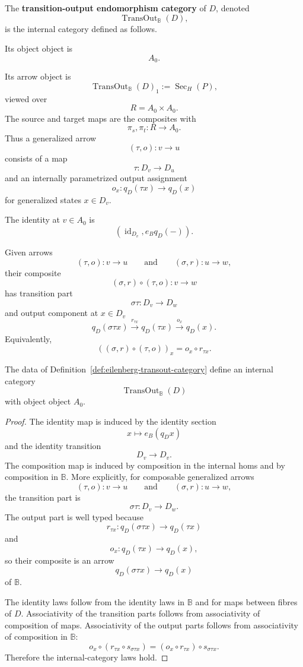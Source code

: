 \begin{definition}
\label{def:eilenberg-transout-category}
The \textbf{transition-output endomorphism category} of \(D\), denoted
\[
\operatorname{TransOut}_{\mathbb B}(D),
\]
is the internal category defined as follows.

Its object object is
\[
A_0.
\]

Its arrow object is
\[
\operatorname{TransOut}_{\mathbb B}(D)_1
:=
\operatorname{Sec}_H(P),
\]
viewed over
\[
R=A_0\times A_0.
\]
The source and target maps are the composites with
\[
\pi_s,\pi_t:R\to A_0.
\]
Thus a generalized arrow
\[
(\tau,o):v\to u
\]
consists of a map
\[
\tau:D_v\to D_u
\]
and an internally parametrized output assignment
\[
o_x:q_D(\tau x)\to q_D(x)
\]
for generalized states \(x\in D_v\).

The identity at \(v\in A_0\) is
\[
(\operatorname{id}_{D_v}, e_Bq_D(-)).
\]

Given arrows
\[
(\tau,o):v\to u
\qquad\text{and}\qquad
(\sigma,r):u\to w,
\]
their composite
\[
(\sigma,r)\circ(\tau,o):v\to w
\]
has transition part
\[
\sigma\tau:D_v\to D_w
\]
and output component at \(x\in D_v\)
\[
q_D(\sigma\tau x)
\xrightarrow{r_{\tau x}}
q_D(\tau x)
\xrightarrow{o_x}
q_D(x).
\]
Equivalently,
\[
((\sigma,r)\circ(\tau,o))_x
=
o_x\circ r_{\tau x}.
\]
\end{definition}

\begin{proposition}
\label{prop:eilenberg-transout-is-internal-category}
The data of Definition~\ref{def:eilenberg-transout-category} define an
internal category
\[
\operatorname{TransOut}_{\mathbb B}(D)
\]
with object object \(A_0\).
\end{proposition}

\begin{proof}
The identity map is induced by the identity section
\[
x\longmapsto e_B(q_Dx)
\]
and the identity transition
\[
D_v\to D_v.
\]
The composition map is induced by composition in the internal homs and by
composition in \(\mathbb B\). More explicitly, for composable generalized
arrows
\[
(\tau,o):v\to u
\qquad\text{and}\qquad
(\sigma,r):u\to w,
\]
the transition part is
\[
\sigma\tau:D_v\to D_w.
\]
The output part is well typed because
\[
r_{\tau x}:q_D(\sigma\tau x)\to q_D(\tau x)
\]
and
\[
o_x:q_D(\tau x)\to q_D(x),
\]
so their composite is an arrow
\[
q_D(\sigma\tau x)\to q_D(x)
\]
of \(\mathbb B\).

The identity laws follow from the identity laws in \(\mathbb B\) and for maps
between fibres of \(D\). Associativity of the transition parts follows from
associativity of composition of maps. Associativity of the output parts
follows from associativity of composition in \(\mathbb B\):
\[
o_x\circ(r_{\tau x}\circ s_{\sigma\tau x})
=
(o_x\circ r_{\tau x})\circ s_{\sigma\tau x}.
\]
Therefore the internal-category laws hold.
\end{proof}

